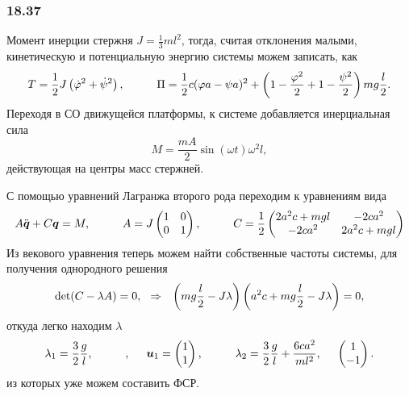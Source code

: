 \subsubsection*{18.37}

Момент инерции стержня $J = \frac{1}{3} m l^2$, тогда, считая отклонения малыми, кинетическую и потенциальную энергию системы можем записать, как
\begin{equation*}
    T = \frac{1}{2} J \left(\dot{\varphi}^2 + \dot{\psi}^2\right),
    \hspace{1 cm}
    \Pi = \frac{1}{2}c (\varphi a - \psi a)^2 + \left(
        1 - \frac{\varphi^2}{2} + 1 - \frac{\psi^2}{2}
    \right) mg \frac{l}{2}.
\end{equation*}
Переходя в СО движущейся платформы, к системе добавляется инерциальная сила
\begin{equation*}
    M = \frac{mA}{2} \sin(\omega t) \omega^2 l,
\end{equation*}
действующая на центры масс стержней.

С помощью уравнений Лагранжа второго рода переходим к уравнениям вида
\begin{equation*}
    A \ddot{\mbox{\boldmath $q$}} + C \mbox{\boldmath $q$} = M,
    \hspace{1 cm}
    A = J \begin{pmatrix}
        1 & 0 \\
        0 & 1 \\
    \end{pmatrix},
    \hspace{1 cm}
    C = \frac{1}{2}\begin{pmatrix}
        2a^2c + mgl & -2ca^2 \\
        -2ca^2 & 2a^2 c + mgl \\
    \end{pmatrix}
\end{equation*}
Из векового уравнения теперь можем найти собственные частоты системы, для получения однородного решения
\begin{equation*}
    \det(C - \lambda A) = 0,
    \hspace{0.25cm} \Rightarrow \hspace{0.25cm}
    \left(
        mg \frac{l}{2} - J \lambda
    \right) \left(
        a^2 c + mg \frac{l}{2} - J \lambda
    \right) = 0,
\end{equation*}
откуда легко находим $\lambda$
\begin{equation*}
    \lambda_1 = \frac{3}{2}\frac{g}{l}, \hspace{1 cm},
    \hspace{0.5 cm} \mbox{\boldmath $u$}_1 = \begin{pmatrix}
        1 \\ 1
    \end{pmatrix},
    \hspace{1 cm}
    \lambda_2 = \frac{3}{2} \frac{g}{l} + \frac{6ca^2}{ml^2},
    \hspace{0.5 cm} 
    \begin{pmatrix}
        1 \\ -1
    \end{pmatrix}.
\end{equation*}
из которых уже можем составить ФСР.

